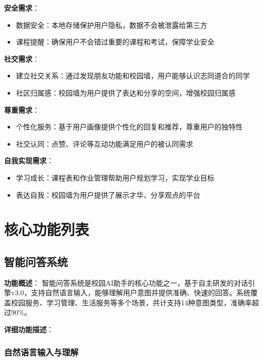 \documentclass[12pt,a4paper]{article}
\begin{document}
\textbf{安全需求}：
\begin{itemize}
    \item 数据安全：本地存储保护用户隐私，数据不会被泄露给第三方
    \item 课程提醒：确保用户不会错过重要的课程和考试，保障学业安全
\end{itemize}

\textbf{社交需求}：
\begin{itemize}
    \item 建立社交关系：通过发现朋友功能和校园墙，用户能够认识志同道合的同学
    \item 社区归属感：校园墙为用户提供了表达和分享的空间，增强校园归属感
\end{itemize}

\textbf{尊重需求}：
\begin{itemize}
    \item 个性化服务：基于用户画像提供个性化的回复和推荐，尊重用户的独特性
    \item 社交认同：点赞、评论等互动功能满足用户的被认同需求
\end{itemize}

\textbf{自我实现需求}：
\begin{itemize}
    \item 学习成长：课程表和作业管理帮助用户规划学习，实现学业目标
    \item 表达自我：校园墙为用户提供了展示才华、分享观点的平台
\end{itemize}

\section{核心功能列表}

\subsection{智能问答系统}

\textbf{功能概述}：
智能问答系统是校园AI助手的核心功能之一，基于自主研发的对话引擎v3.0，支持自然语言输入，能够理解用户意图并提供准确、快速的回答。系统覆盖校园服务、学习管理、生活服务等多个场景，共计支持14种意图类型，准确率超过90\%。

\textbf{详细功能描述}：

\subsubsection{自然语言输入与理解}
\end{document}

